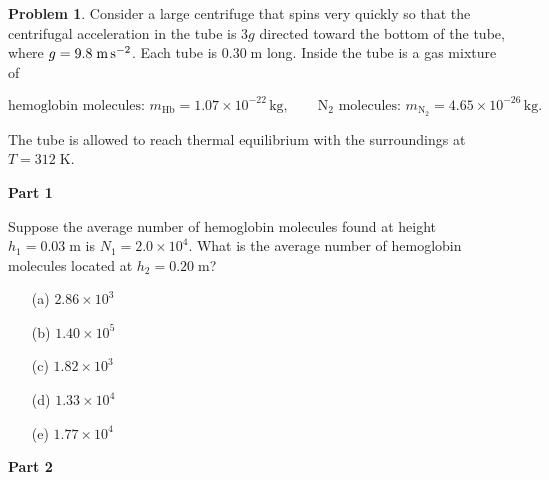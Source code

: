 \documentclass[10pt]{article}
\theoremstyle{definition} %
\newtheorem{problem}{Problem}
\theoremstyle{plain} %
\begin{document}
                          \begin{problem}
                            Consider a large centrifuge that spins very quickly so that the
                            centrifugal acceleration in the tube is \(3g\) directed toward the bottom
                            of the tube, where \(g = 9.8\;\text{m\,s}^{-2}\).
                            Each tube is \(0.30\;\text{m}\) long.
                            Inside the tube is a gas mixture of
                            
                            \[
                               \text{hemoglobin molecules: } m_{\mathrm{Hb}} = 1.07\times10^{-22}\,\text{kg},
                               \qquad
                               \text{N}_{2}\text{ molecules: } m_{\mathrm{N_2}} = 4.65\times10^{-26}\,\text{kg}.
                            \]
                            
                            The tube is allowed to reach thermal equilibrium with the surroundings at
                            \(T = 312\;\text{K}\).
                            
                            \medskip
                            \textbf{Part 1}
                            
                            Suppose the average number of hemoglobin molecules found at height
                            \(h_{1}=0.03\;\text{m}\) is \(N_{1}=2.0\times10^{4}\).
                            What is the average number of hemoglobin molecules located at
                            \(h_{2}=0.20\;\text{m}\)?
                            
                            \begin{enumerate}
                              \item[(a)] \(2.86\times10^{3}\)
                              \item[(b)] \(1.40\times10^{5}\)
                              \item[(c)] \(1.82\times10^{3}\)
                              \item[(d)] \(1.33\times10^{4}\)
                              \item[(e)] \(1.77\times10^{4}\)
                            \end{enumerate}
                            
                            \bigskip
                            \textbf{Part 2}
                            

\end{problem}
\end{document}
